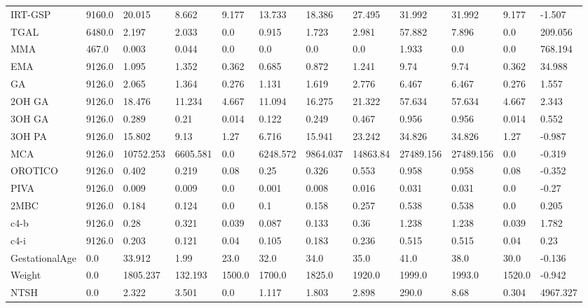 \begin{tabular}{llllllllllll}
IRT-GSP & 9160.0 & 20.015 & 8.662 & 9.177 & 13.733 & 18.386 & 27.495 & 31.992 & 31.992 & 9.177 & -1.507 \\
TGAL & 6480.0 & 2.197 & 2.033 & 0.0 & 0.915 & 1.723 & 2.981 & 57.882 & 7.896 & 0.0 & 209.056 \\
MMA & 467.0 & 0.003 & 0.044 & 0.0 & 0.0 & 0.0 & 0.0 & 1.933 & 0.0 & 0.0 & 768.194 \\
EMA & 9126.0 & 1.095 & 1.352 & 0.362 & 0.685 & 0.872 & 1.241 & 9.74 & 9.74 & 0.362 & 34.988 \\
GA & 9126.0 & 2.065 & 1.364 & 0.276 & 1.131 & 1.619 & 2.776 & 6.467 & 6.467 & 0.276 & 1.557 \\
2OH GA & 9126.0 & 18.476 & 11.234 & 4.667 & 11.094 & 16.275 & 21.322 & 57.634 & 57.634 & 4.667 & 2.343 \\
3OH GA & 9126.0 & 0.289 & 0.21 & 0.014 & 0.122 & 0.249 & 0.467 & 0.956 & 0.956 & 0.014 & 0.552 \\
3OH PA & 9126.0 & 15.802 & 9.13 & 1.27 & 6.716 & 15.941 & 23.242 & 34.826 & 34.826 & 1.27 & -0.987 \\
MCA & 9126.0 & 10752.253 & 6605.581 & 0.0 & 6248.572 & 9864.037 & 14863.84 & 27489.156 & 27489.156 & 0.0 & -0.319 \\
OROTICO & 9126.0 & 0.402 & 0.219 & 0.08 & 0.25 & 0.326 & 0.553 & 0.958 & 0.958 & 0.08 & -0.352 \\
PIVA & 9126.0 & 0.009 & 0.009 & 0.0 & 0.001 & 0.008 & 0.016 & 0.031 & 0.031 & 0.0 & -0.27 \\
2MBC & 9126.0 & 0.184 & 0.124 & 0.0 & 0.1 & 0.158 & 0.257 & 0.538 & 0.538 & 0.0 & 0.205 \\
c4-b & 9126.0 & 0.28 & 0.321 & 0.039 & 0.087 & 0.133 & 0.36 & 1.238 & 1.238 & 0.039 & 1.782 \\
c4-i & 9126.0 & 0.203 & 0.121 & 0.04 & 0.105 & 0.183 & 0.236 & 0.515 & 0.515 & 0.04 & 0.23 \\
GestationalAge & 0.0 & 33.912 & 1.99 & 23.0 & 32.0 & 34.0 & 35.0 & 41.0 & 38.0 & 30.0 & -0.136 \\
Weight & 0.0 & 1805.237 & 132.193 & 1500.0 & 1700.0 & 1825.0 & 1920.0 & 1999.0 & 1993.0 & 1520.0 & -0.942 \\
NTSH & 0.0 & 2.322 & 3.501 & 0.0 & 1.117 & 1.803 & 2.898 & 290.0 & 8.68 & 0.304 & 4967.327 \\
\bottomrule
\end{tabular}
